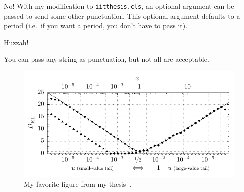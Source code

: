 \documentclass{iitthesis}
\begin{document}

%
No! With my modification to {\tt iitthesis.cls}, an optional argument can be passed to send
some other punctuation. This optional argument defaults to a period
(i.e.\ if you want a period, you don't have to pass it).

\begin{verb}
\end{verb}


 Huzzah!


% 
You can pass any string as punctuation, but not all are acceptable.
 
\begin{verb}
\end{verb}



\begin{figure}[h]
\centering
\includegraphics[scale=1]{Figures/infoLoss_exponential.pdf}
\caption{My favorite figure from my thesis~\cite{Pedersen:thesis}.}
\label{fig:favorite}
\end{figure}
\end{document}
